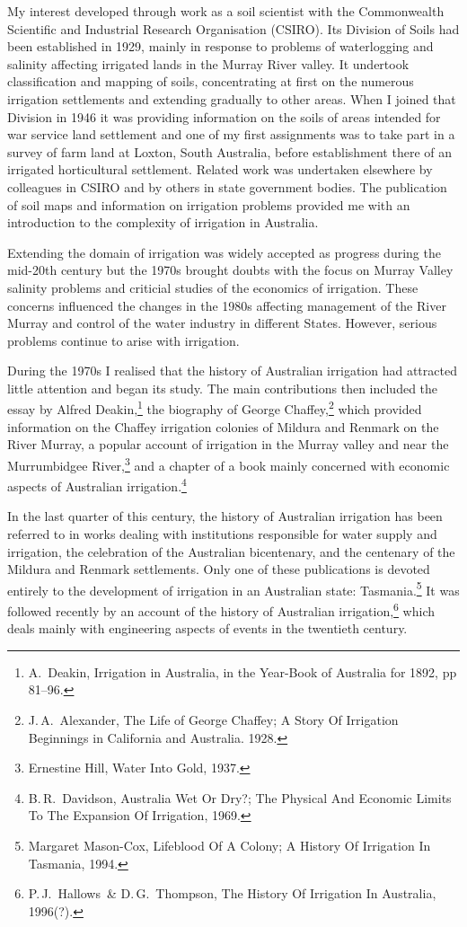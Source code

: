 My interest developed through work as a soil scientist with the
Commonwealth Scientific and Industrial Research Organisation (CSIRO).
Its Division of Soils had been established in 1929, mainly in response
to problems of waterlogging and salinity affecting irrigated lands in
the Murray River valley.  It undertook classification and mapping of
soils, concentrating at first on the numerous irrigation settlements
and extending gradually to other areas.  When I joined that Division
in 1946 it was providing information on the soils of areas intended
for war service land settlement and one of my first assignments was to
take part in a survey of farm land at Loxton, South Australia, before
establishment there of an irrigated horticultural settlement.  Related
work was undertaken elsewhere by colleagues in CSIRO and by others in
state government bodies.  The publication of soil maps and information
on irrigation problems provided me with an introduction to the
complexity of irrigation in Australia.

Extending the domain of irrigation was widely accepted as progress
during the mid-20th century but the 1970s brought doubts with the
focus on Murray Valley salinity problems and criticial studies of the
economics of irrigation.  These concerns influenced the changes in the
1980s affecting management of the River Murray and control of the
water industry in different States.  However, serious problems continue
to arise with irrigation.

During the 1970s I realised that the history of Australian irrigation
had attracted little attention and began its study.  The main
contributions then included the essay by Alfred Deakin,\footnote
{A.~Deakin, Irrigation in Australia, in the Year-Book of Australia for
1892, pp 81--96.} the biography of George
Chaffey,\footnote{J.\,A.~Alexander, The Life of George Chaffey; A Story
Of Irrigation Beginnings in California and Australia. 1928.} which
provided information on the Chaffey irrigation colonies of Mildura and
Renmark on the River Murray, a popular account of irrigation in the
Murray valley and near the Murrumbidgee River,\footnote{Ernestine Hill,
Water Into Gold, 1937.} and a chapter of a book mainly concerned with
economic aspects of Australian irrigation.\footnote{B.\,R.~Davidson,
Australia Wet Or Dry?; The Physical And Economic Limits To The
Expansion Of Irrigation, 1969.}

In the last quarter of this century, the history of Australian
irrigation has been referred to in works dealing with institutions
responsible for water supply and irrigation, the celebration of the
Australian bicentenary, and the centenary of the Mildura and Renmark
settlements.  Only one of these publications is devoted entirely to
the development of irrigation in an Australian state:
Tasmania.\footnote{Margaret Mason-Cox, Lifeblood Of A Colony; A History
Of Irrigation In Tasmania, 1994.}  It was followed recently by an
account of the history of Australian
irrigation,\footnote{P.\,J.~Hallows~\& D.\,G.~Thompson, The History Of
Irrigation In Australia, 1996(?).} which deals mainly with engineering
aspects of events in the twentieth century.


